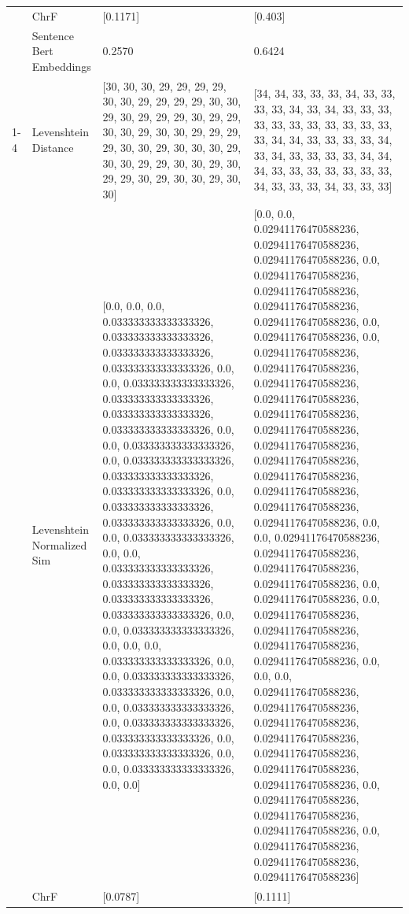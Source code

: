 \begin{tabular}{llll}
 & ChrF & [0.1171] & [0.403] \\
 & Sentence Bert Embeddings & 0.2570 & 0.6424 \\
\cline{1-4}
\multirow[t]{4}{*}{Matumbi ma njamba matituranaga} & Levenshtein Distance & [30, 30, 30, 29, 29, 29, 29, 30, 30, 29, 29, 29, 29, 30, 30, 29, 30, 29, 29, 29, 30, 29, 29, 30, 30, 29, 30, 30, 29, 29, 29, 29, 30, 30, 29, 30, 30, 30, 29, 30, 30, 29, 29, 30, 30, 29, 30, 29, 29, 30, 29, 30, 30, 29, 30, 30] & [34, 34, 33, 33, 33, 34, 33, 33, 33, 33, 34, 33, 34, 33, 33, 33, 33, 33, 33, 33, 33, 33, 33, 33, 33, 34, 34, 33, 33, 33, 33, 34, 33, 34, 33, 33, 33, 33, 34, 34, 34, 33, 33, 33, 33, 33, 33, 33, 34, 33, 33, 33, 34, 33, 33, 33] \\
 & Levenshtein Normalized Sim & [0.0, 0.0, 0.0, 0.033333333333333326, 0.033333333333333326, 0.033333333333333326, 0.033333333333333326, 0.0, 0.0, 0.033333333333333326, 0.033333333333333326, 0.033333333333333326, 0.033333333333333326, 0.0, 0.0, 0.033333333333333326, 0.0, 0.033333333333333326, 0.033333333333333326, 0.033333333333333326, 0.0, 0.033333333333333326, 0.033333333333333326, 0.0, 0.0, 0.033333333333333326, 0.0, 0.0, 0.033333333333333326, 0.033333333333333326, 0.033333333333333326, 0.033333333333333326, 0.0, 0.0, 0.033333333333333326, 0.0, 0.0, 0.0, 0.033333333333333326, 0.0, 0.0, 0.033333333333333326, 0.033333333333333326, 0.0, 0.0, 0.033333333333333326, 0.0, 0.033333333333333326, 0.033333333333333326, 0.0, 0.033333333333333326, 0.0, 0.0, 0.033333333333333326, 0.0, 0.0] & [0.0, 0.0, 0.02941176470588236, 0.02941176470588236, 0.02941176470588236, 0.0, 0.02941176470588236, 0.02941176470588236, 0.02941176470588236, 0.02941176470588236, 0.0, 0.02941176470588236, 0.0, 0.02941176470588236, 0.02941176470588236, 0.02941176470588236, 0.02941176470588236, 0.02941176470588236, 0.02941176470588236, 0.02941176470588236, 0.02941176470588236, 0.02941176470588236, 0.02941176470588236, 0.02941176470588236, 0.02941176470588236, 0.0, 0.0, 0.02941176470588236, 0.02941176470588236, 0.02941176470588236, 0.02941176470588236, 0.0, 0.02941176470588236, 0.0, 0.02941176470588236, 0.02941176470588236, 0.02941176470588236, 0.02941176470588236, 0.0, 0.0, 0.0, 0.02941176470588236, 0.02941176470588236, 0.02941176470588236, 0.02941176470588236, 0.02941176470588236, 0.02941176470588236, 0.02941176470588236, 0.0, 0.02941176470588236, 0.02941176470588236, 0.02941176470588236, 0.0, 0.02941176470588236, 0.02941176470588236, 0.02941176470588236] \\
 & ChrF & [0.0787] & [0.1111] \\

\end{tabular}
